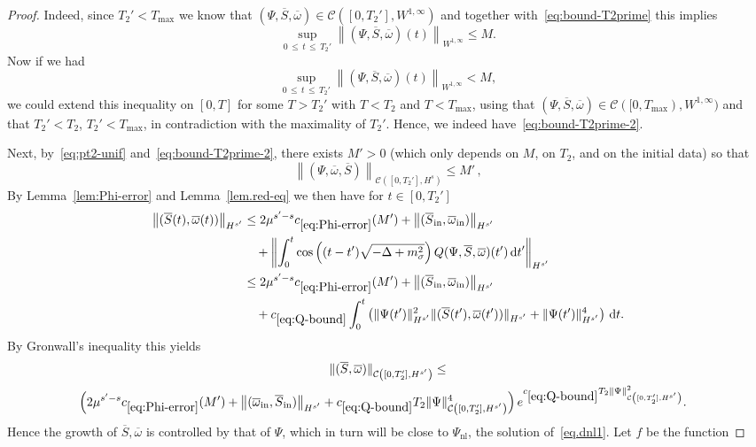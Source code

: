 \documentclass[AHL,Unicode,longabstracts,published]{cedram}
\newcommand{\rmin}{\mathrm{in}}
\newcommand{\nl}{\mathrm{nl}}
\newcommand{\cC}{\mathcal{C}}
\renewcommand\d[1]{{\ensuremath{\,\text{d}#1}}}
\begin{document}
\begin{proof}
Indeed, since $T_2'<T_{\max}$ we know that $(\Psi,\overline{S}, \overline{\omega})\in\cC([0,T_2'],W^{1,\infty})$ and together with~\eqref{eq:bound-T2prime} this implies
\[
\sup_{0\,\leq\,t\,\leq\,T_2'}\left\|(\Psi,\overline{S}, \overline{\omega})(t)\right\|_{W^{1,\infty}}\leq M.
\]
Now if we had
\[
\sup_{0\,\leq\,t\,\leq\,T_2'}\left\|(\Psi,\overline{S}, \overline{\omega})(t)\right\|_{W^{1,\infty}}<M,
\]
we could extend this inequality on $[0,T]$ for some $T>T_2'$ with $T<T_2$ and $T<T_{\max}$, using that $(\Psi,\overline{S}, \overline{\omega})\in\cC([0,T_{\max}),W^{1,\infty})$ and that $T_2'<T_2$, $T_2'<T_{\max}$, in contradiction with the maximality of $T_2'$. Hence, we indeed have~\eqref{eq:bound-T2prime-2}.

Next, by~\eqref{eq:pt2-unif} and~\eqref{eq:bound-T2prime-2}, there exists $M'>0$ (which only depends on $M$, on $T_2$, and on the initial data) so that
\[
\left\|(\Psi,\overline{\omega},\overline{S})\right\|_{\cC\left([0,T_2'], {H}^s\right)}
\leq M'\,,
\]
By Lemma~\ref{lem:Phi-error} and Lemma~\ref{lem.red-eq} we then have for $t\in [0, T_2']$
\begin{align*}
\left\|(\overline{S}(t), \overline{\omega}(t))\right\|_{H^{s'}} &\leq 2\mu^{s'-s} c_{\eqref{eq:Phi-error}}(M') + \left\|(\overline{S}_\rmin,\overline{\omega}_\rmin)\right\|_{H^{s'}} \\
&\quad + \left\|\int_0^t\cos\left((t-t')\sqrt{-\Delta + m^2_\sigma}\right) Q(\Psi, \overline{S}, \overline{\omega})(t')\d t'\right\|_{H^{s'}} \\
&\leq 2\mu^{s'-s} c_{\eqref{eq:Phi-error}}(M') + \left\|(\overline{S}_\rmin,\overline{\omega}_\rmin)\right\|_{H^{s'}} \\
&\quad + c_{\eqref{eq:Q-bound}}\int_0^{t} \left(\|\Psi(t')\|_{H^{s'}}^2 \|(\overline{S}(t'), \overline{\omega}(t'))\|_{H^{s'}} + \|\Psi(t')\|_{H^{s'}}^4\right)\d t.
\end{align*}
By Gronwall's inequality this yields
\begin{multline}\label{eq:S-Psi bound}
\|(\overline{S}, \overline{\omega})\|_{\cC\left([0,T_2'], H^{s'}\right)}\leq\\
\mkern-14mu\left(2\mu^{s'-s}c_{\eqref{eq:Phi-error}}(M') + \left\|(\overline\omega_\rmin, \overline{S}_\rmin)\right\|_{H^{s'}} +c_{\eqref{eq:Q-bound}} T_2 \|\Psi\|_{\cC\left([0,T_2'], H^{s'}\right)}^4 \right) e^{c_{\eqref{eq:Q-bound}} T_2 \|\Psi\|_{\cC\left([0,T_2'], H^{s'}\right)}^2}.
\end{multline}
Hence the growth of $\overline{S}, \overline{\omega}$ is controlled by that of $\Psi$, which in turn will be close to $\Psi_\nl$, the solution of~\eqref{eq.dnl1}. Let $f$ be the function

\end{proof}
\end{document}
